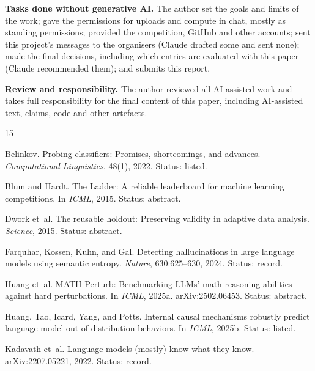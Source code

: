 \documentclass{article}
\begin{document}
\textbf{Tasks done without generative AI.} The author set the goals and limits of the work; gave the permissions for uploads and compute in chat, mostly as standing permissions; provided the competition, GitHub and other accounts; sent this project's messages to the organisers (Claude drafted some and sent none); made the final decisions, including which entries are evaluated with this paper (Claude recommended them); and submits this report.

\textbf{Review and responsibility.} The author reviewed all AI-assisted work and takes full responsibility for the final content of this paper, including AI-assisted text, claims, code and other artefacts.

\begin{thebibliography}{15}

Belinkov.
\newblock Probing classifiers: Promises, shortcomings, and advances.
\newblock \emph{Computational Linguistics}, 48(1), 2022.
\newblock Status: listed.

Blum and Hardt.
\newblock The Ladder: A reliable leaderboard for machine learning competitions.
\newblock In \emph{ICML}, 2015.
\newblock Status: abstract.

Dwork et~al.
\newblock The reusable holdout: Preserving validity in adaptive data analysis.
\newblock \emph{Science}, 2015.
\newblock Status: abstract.

Farquhar, Kossen, Kuhn, and Gal.
\newblock Detecting hallucinations in large language models using semantic entropy.
\newblock \emph{Nature}, 630:625--630, 2024.
\newblock Status: record.

Huang et~al.
\newblock MATH-Perturb: Benchmarking LLMs' math reasoning abilities against hard perturbations.
\newblock In \emph{ICML}, 2025a. arXiv:2502.06453.
\newblock Status: abstract.

Huang, Tao, Icard, Yang, and Potts.
\newblock Internal causal mechanisms robustly predict language model out-of-distribution behaviors.
\newblock In \emph{ICML}, 2025b.
\newblock Status: listed.

Kadavath et~al.
\newblock Language models (mostly) know what they know.
\newblock arXiv:2207.05221, 2022.
\newblock Status: record.


\end{thebibliography}
\end{document}
